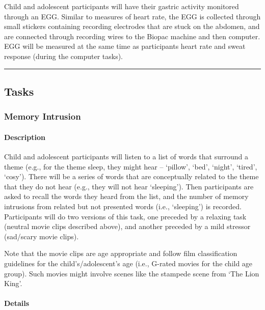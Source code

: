 \documentclass[
]{book}
\begin{document}
Child and adolescent participants will have their gastric activity monitored through an EGG. Similar to measures of heart rate, the EGG is collected through small stickers containing recording electrodes that are stuck on the abdomen, and are connected through recording wires to the Biopac machine and then computer. EGG will be measured at the same time as participants heart rate and sweat response (during the computer tasks).

\begin{center}\rule{0.5\linewidth}{0.5pt}\end{center}

\hypertarget{tasks}{%
\subsection{Tasks}\label{tasks}}

\hypertarget{memory-intrusion}{%
\subsubsection{Memory Intrusion}\label{memory-intrusion}}

\hypertarget{description-1}{%
\paragraph{Description}\label{description-1}}

Child and adolescent participants will listen to a list of words that surround a theme (e.g., for the theme sleep, they might hear -- `pillow', `bed', `night', `tired', `cosy'). There will be a series of words that are conceptually related to the theme that they do not hear (e.g., they will not hear `sleeping'). Then participants are asked to recall the words they heard from the list, and the number of memory intrusions from related but not presented words (i.e., `sleeping') is recorded. Participants will do two versions of this task, one preceded by a relaxing task (neutral movie clips described above), and another preceded by a mild stressor (sad/scary movie clips).

Note that the movie clips are age appropriate and follow film classification guidelines for the child's/adolescent's age (i.e., G-rated movies for the child age group). Such movies might involve scenes like the stampede scene from `The Lion King'.

\hypertarget{details-1}{%
\paragraph{Details}\label{details-1}}
\end{document}
